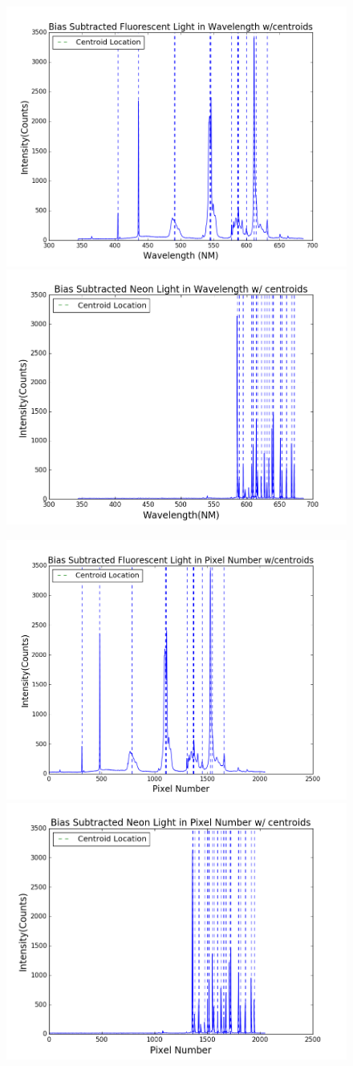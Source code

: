 \documentclass[onecolumn, 12pt, a4paper]{article}
\begin{document}
\begin{subfigure}{\linewidth}\hspace*{-1.2cm}
  \includegraphics[width=.55\linewidth]{fcentw.png}
  \includegraphics[width=.55\linewidth]{neoncentw.png}
  \end{subfigure}\par\medskip
  \begin{subfigure}{\linewidth}\hspace*{-1.2cm}
  \includegraphics[width=.55\linewidth]{fcentp.png}
  \includegraphics[width=.55\linewidth]{neoncentp.png}
  \end{subfigure}\par\medskip
\end{document}
